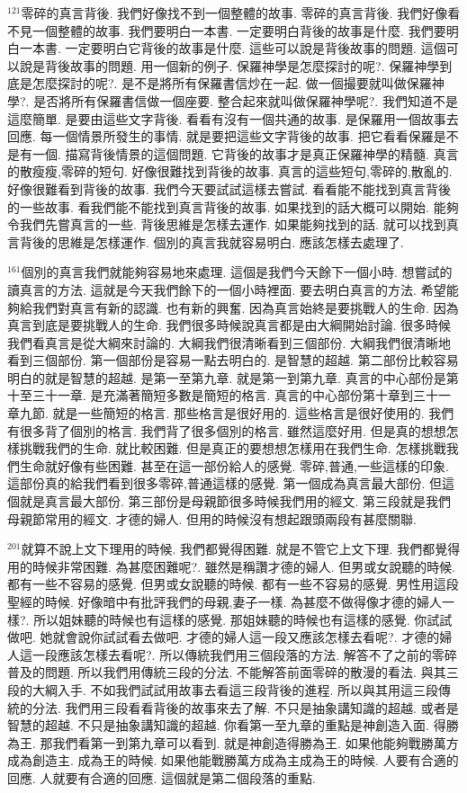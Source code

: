 \documentclass{book}
\begin{document}
$^{121}$零碎的真言背後.
我們好像找不到一個整體的故事.
零碎的真言背後.
我們好像看不見一個整體的故事.
我們要明白一本書.
一定要明白背後的故事是什麼.
我們要明白一本書.
一定要明白它背後的故事是什麼.
這些可以說是背後故事的問題.
這個可以說是背後故事的問題.
用一個新的例子.
保羅神學是怎麼探討的呢?.
保羅神學到底是怎麼探討的呢?.
是不是將所有保羅書信炒在一起.
做一個撮要就叫做保羅神學?.
是否將所有保羅書信做一個座要.
整合起來就叫做保羅神學呢?.
我們知道不是這麼簡單.
是要由這些文字背後.
看看有沒有一個共通的故事.
是保羅用一個故事去回應.
每一個情景所發生的事情.
就是要把這些文字背後的故事.
把它看看保羅是不是有一個.
描寫背後情景的這個問題.
它背後的故事才是真正保羅神學的精髓.
真言的散瘦瘦,零碎的短句.
好像很難找到背後的故事.
真言的這些短句,零碎的,散亂的.
好像很難看到背後的故事.
我們今天要試試這樣去嘗試.
看看能不能找到真言背後的一些故事.
看我們能不能找到真言背後的故事.
如果找到的話大概可以開始.
能夠令我們先嘗真言的一些.
背後思維是怎樣去運作.
如果能夠找到的話.
就可以找到真言背後的思維是怎樣運作.
個別的真言我就容易明白.
應該怎樣去處理了.

$^{161}$個別的真言我們就能夠容易地來處理.
這個是我們今天餘下一個小時.
想嘗試的讀真言的方法.
這就是今天我們餘下的一個小時裡面.
要去明白真言的方法.
希望能夠給我們對真言有新的認識.
也有新的興奮.
因為真言始終是要挑戰人的生命.
因為真言到底是要挑戰人的生命.
我們很多時候說真言都是由大綱開始討論.
很多時候我們看真言是從大綱來討論的.
大綱我們很清晰看到三個部份.
大綱我們很清晰地看到三個部份.
第一個部份是容易一點去明白的.
是智慧的超越.
第二部份比較容易明白的就是智慧的超越.
是第一至第九章.
就是第一到第九章.
真言的中心部份是第十至三十一章.
是充滿著簡短多數是簡短的格言.
真言的中心部份第十章到三十一章九節.
就是一些簡短的格言.
那些格言是很好用的.
這些格言是很好使用的.
我們有很多背了個別的格言.
我們背了很多個別的格言.
雖然這麼好用.
但是真的想想怎樣挑戰我們的生命.
就比較困難.
但是真正的要想想怎樣用在我們生命.
怎樣挑戰我們生命就好像有些困難.
甚至在這一部份給人的感覺.
零碎,普通,一些這樣的印象.
這部份真的給我們看到很多零碎,普通這樣的感覺.
第一個成為真言最大部份.
但這個就是真言最大部份.
第三部份是母親節很多時候我們用的經文.
第三段就是我們母親節常用的經文.
才德的婦人.
但用的時候沒有想起跟頭兩段有甚麼關聯.

$^{201}$就算不說上文下理用的時候.
我們都覺得困難.
就是不管它上文下理.
我們都覺得用的時候非常困難.
為甚麼困難呢?.
雖然是稱讚才德的婦人.
但男或女說聽的時候.
都有一些不容易的感覺.
但男或女說聽的時候.
都有一些不容易的感覺.
男性用這段聖經的時候.
好像暗中有批評我們的母親,妻子一樣.
為甚麼不做得像才德的婦人一樣?.
所以姐妹聽的時候也有這樣的感覺.
那姐妹聽的時候也有這樣的感覺.
你試試做吧.
她就會說你試試看去做吧.
才德的婦人這一段又應該怎樣去看呢?.
才德的婦人這一段應該怎樣去看呢?.
所以傳統我們用三個段落的方法.
解答不了之前的零碎普及的問題.
所以我們用傳統三段的分法.
不能解答前面零碎的散漫的看法.
與其三段的大綱入手.
不如我們試試用故事去看這三段背後的進程.
所以與其用這三段傳統的分法.
我們用三段看看背後的故事來去了解.
不只是抽象講知識的超越.
或者是智慧的超越.
不只是抽象講知識的超越.
你看第一至九章的重點是神創造入面.
得勝為王.
那我們看第一到第九章可以看到.
就是神創造得勝為王.
如果他能夠戰勝萬方成為創造主.
成為王的時候.
如果他能戰勝萬方成為主成為王的時候.
人要有合適的回應.
人就要有合適的回應.
這個就是第二個段落的重點.
\end{document}
